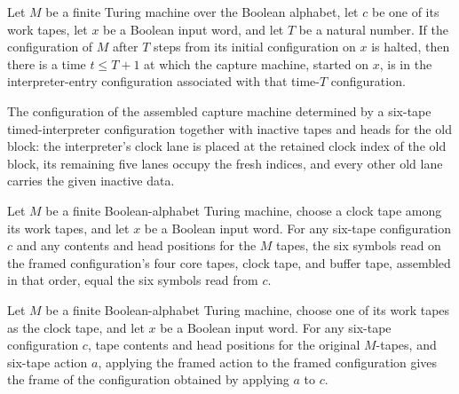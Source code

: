 \begin{lemma}
\label{Turing.timedCapture_start}
\leanok
{}
Let $M$ be a finite Turing machine over the Boolean alphabet, let $c$ be one of its work
tapes, let $x$ be a Boolean input word, and let $T$ be a natural number. If the
configuration of $M$ after $T$ steps from its initial configuration on $x$ is halted,
then there is a time $t\le T+1$ at which the capture machine, started on $x$, is in the
interpreter-entry configuration associated with that time-$T$ configuration.
\end{lemma}

\begin{definition}
\label{Turing.timedFrame}
\leanok
{}
The configuration of the assembled capture machine determined by a six-tape
timed-interpreter configuration together with inactive tapes and heads for the
old block: the interpreter's clock lane is placed at the retained clock index
of the old block, its remaining five lanes occupy the fresh indices, and every
other old lane carries the given inactive data.
\end{definition}

\begin{lemma}
\label{Turing.timedFrame_reads}
\leanok
{}
Let $M$ be a finite Boolean-alphabet Turing machine, choose a clock tape among its work
tapes, and let $x$ be a Boolean input word. For any six-tape configuration $c$ and any
contents and head positions for the $M$ tapes, the six symbols read on the framed
configuration's four core tapes, clock tape, and buffer tape, assembled in that order,
equal the six symbols read from $c$.
\end{lemma}

\begin{lemma}
\label{Turing.timedFrame_apply}
\leanok
{}
Let $M$ be a finite Boolean-alphabet Turing machine, choose one of its work tapes as the
clock tape, and let $x$ be a Boolean input word. For any six-tape configuration $c$,
tape contents and head positions for the original $M$-tapes, and six-tape action $a$,
applying the framed action to the framed configuration gives the frame of the
configuration obtained by applying $a$ to $c$.
\end{lemma}

